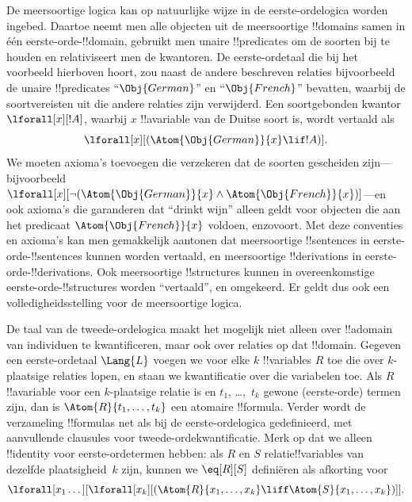 \documentclass[openany]{memoir}
\begin{document}
De meersoortige logica kan op natuurlijke wijze in de
eerste-ordelogica worden ingebed. Daartoe neemt men alle objecten uit
de meersoortige !!{domain}s samen in één eerste-orde-!!{domain}, gebruikt
men unaire !!{predicate}s om de soorten bij te houden en relativiseert
men de kwantoren. De eerste-ordetaal die bij het voorbeeld hierboven
hoort, zou naast de andere beschreven relaties bijvoorbeeld de unaire
!!{predicate}s ``$\Obj{German}$'' en ``$\Obj{French}$'' bevatten, waarbij de
soortvereisten uit die andere relaties zijn verwijderd. Een
soortgebonden kwantor $\lforall[x][!A]$, waarbij $x$ !!a{variable} van de
Duitse soort is, wordt vertaald als
\[
\lforall[x][(\Atom{\Obj{German}}{x} \lif !A)].
\]
We moeten axioma's toevoegen die verzekeren dat de soorten gescheiden
zijn---bijvoorbeeld
$\lforall[x][\lnot (\Atom{\Obj{German}}{x} \land
  \Atom{\Obj{French}}{x})]$---en ook axioma's die garanderen dat
``drinkt wijn'' alleen geldt voor objecten die aan het predicaat
$\Atom{\Obj{French}}{x}$ voldoen, enzovoort. Met deze conventies en
axioma's kan men gemakkelijk aantonen dat meersoortige !!{sentence}s
in eerste-orde-!!{sentence}s kunnen worden vertaald, en meersoortige
!!{derivation}s in eerste-orde-!!{derivation}s. Ook meersoortige
!!{structure}s kunnen in overeenkomstige eerste-orde-!!{structure}s
worden ``vertaald'', en omgekeerd. Er geldt dus ook een
volledigheidsstelling voor de meersoortige logica.
\endgroup

\begingroup
\def\olfilename{OLP-0177}
\def\olfilepath{content/first-order-logic/beyond/}
\hypertarget{unit-OLP-0177}{}





De taal van de tweede-ordelogica maakt het mogelijk niet alleen over
!!a{domain} van individuen te kwantificeren, maar ook over relaties op dat
!!{domain}. Gegeven een eerste-ordetaal $\Lang{L}$ voegen we voor elke $k$
!!{variable}s $R$ toe die over $k$-plaatsige relaties lopen, en staan we
kwantificatie over die variabelen toe. Als $R$ !!a{variable} voor een
$k$-plaatsige relatie is en $t_1$, \dots,~$t_k$ gewone (eerste-orde) termen
zijn, dan is $\Atom{R}{t_1,\dots,t_k}$ een atomaire !!{formula}. Verder wordt
de verzameling !!{formula}s net als bij de eerste-ordelogica gedefinieerd,
met aanvullende clausules voor tweede-ordekwantificatie. Merk op dat we alleen
!!{identity} voor eerste-ordetermen hebben: als $R$ en $S$ relatie!!{variable}s
van dezelfde plaatsigheid~$k$ zijn, kunnen we $\eq[R][S]$ definiëren als
afkorting voor
\[
\lforall[x_1 \dots][\lforall[x_k][(\Atom{R}{x_1, \dots, x_k} \liff
  \Atom{S}{x_1, \dots, x_k})]].
\]
\end{document}

